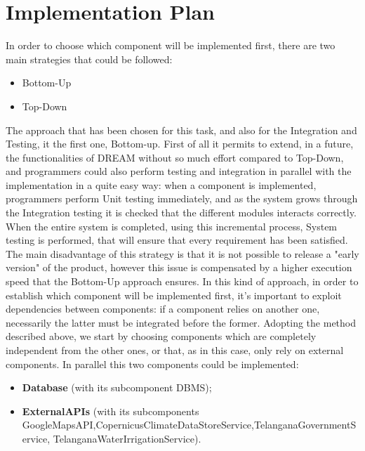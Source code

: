 \section{Implementation Plan}

In order to choose which component will be implemented first, there are two main strategies that could be followed:
\begin{itemize}
    \item Bottom-Up
    \item Top-Down 
\end{itemize}
The approach that has been chosen for this task, and also for the Integration and Testing, it the first one, Bottom-up.
First of all it permits to extend, in a future, the functionalities of DREAM without so much effort compared to Top-Down, and programmers could also perform testing and integration in parallel with the implementation in a quite easy way: when a component is implemented, programmers perform Unit testing immediately, and as the system grows through the Integration testing it is checked that the different modules interacts correctly. When the entire system is completed, using this incremental process, System testing is performed, that will ensure that every requirement has been satisfied.\newline
The main disadvantage of this strategy is that it is not possible to release a "early version" of the product, however this issue is compensated by a higher execution speed that the Bottom-Up approach ensures.
In this kind of approach, in order to establish which component will be implemented first, it's important to exploit dependencies between components: if a component relies on another one, necessarily the latter must be integrated before the former.
Adopting the method described above, we start by choosing components which are completely independent from the other ones, or that, as in this case, only rely on external components.\newline
In parallel this two components could be implemented: 
\begin{itemize}
    \item \textbf{Database} (with its subcomponent DBMS);
    \item \textbf{ExternalAPIs} (with its subcomponents GoogleMapsAPI,\newline CopernicusClimateDataStoreService,\newline TelanganaGovernmentService, TelanganaWaterIrrigationService).
\end{itemize}

